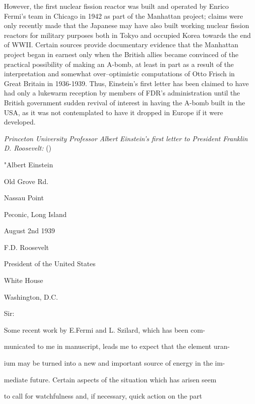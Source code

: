 \documentclass[12pt]{article}
\begin{document}
 However, the first nuclear fission reactor was built and operated by Enrico Fermi's team in Chicago in 1942 as part of the Manhattan project; claims were only recently made that the Japanese may have also built working nuclear fission reactors for military purposes both in Tokyo and occupied Korea towards the end of WWII. Certain sources provide
documentary evidence that the Manhattan project began in earnest only when the British allies became convinced of the
practical possibility of making an A-bomb, at least in part as a result of the interpretation and somewhat over--optimistic computations of Otto Frisch in Great Britain in 1936-1939. Thus, Einstein's first letter has been claimed
to have had only a lukewarm reception by members of FDR's administration until the British government sudden revival
of interest in having the A-bomb built in the USA, as it was not contemplated to have it dropped in Europe if it were
developed.  

 \emph{Princeton University Professor Albert Einstein's first letter to President Franklin D. Roosevelt:}
()


"Albert Einstein

 Old Grove Rd.

 Nassau Point

 Peconic, Long Island


                                                         

                                                       August 2nd 1939




F.D. Roosevelt

 President of the United States

 White House

 Washington, D.C.



Sir:

      Some recent work by E.Fermi and L. Szilard, which has been com-

municated to me in manuscript, leads me to expect that the element uran-

ium may be turned into a new and important source of energy in the im-

mediate future. Certain aspects of the situation which has arisen seem

to call for watchfulness and, if necessary, quick action on the part
\end{document}

